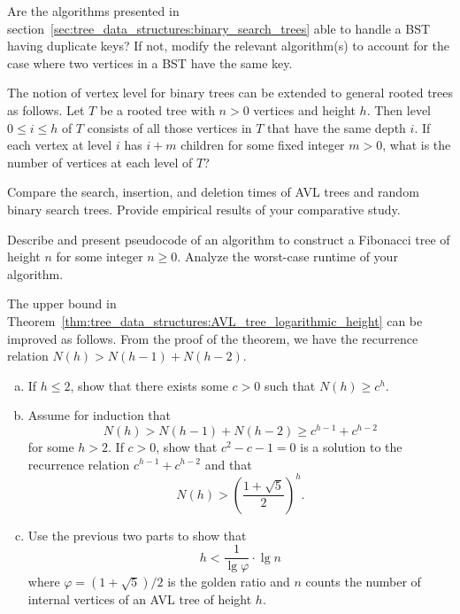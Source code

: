 \begin{problem}
\item Are the algorithms presented in
  section~\ref{sec:tree_data_structures:binary_search_trees} able to
  handle a BST having duplicate keys? If not, modify the relevant
  algorithm(s) to account for the case where two vertices in a BST
  have the same key.

\item The notion of vertex level for binary trees can be extended to
  general rooted trees as follows. Let $T$ be a rooted tree with
  $n > 0$ vertices and height $h$. Then level
  $0 \leq i \leq h$ of $T$ consists of all those vertices in $T$ that
  have the same depth $i$. If each vertex at level $i$ has $i + m$
  children for some fixed integer $m > 0$, what is the number of
  vertices at each level of $T$?

\item Compare the search, insertion, and deletion times of AVL trees
  and random binary search trees. Provide empirical results of your
  comparative study.

\item Describe and present pseudocode of an algorithm to construct a
  Fibonacci tree of height $n$ for some integer
  $n \geq 0$. Analyze the worst-case runtime of your algorithm.

\item The upper bound in
  Theorem~\ref{thm:tree_data_structures:AVL_tree_logarithmic_height}
  can be improved as follows. From the proof of the theorem, we have
  the recurrence relation
  $N(h) > N(h - 1) + N(h - 2)$.
  \begin{enumerate}[(a)]
  \item If $h \leq 2$, show that there exists some $c > 0$ such that
    $N(h) \geq c^h$.

  \item Assume for induction that
    \[
    N(h)
    >
    N(h - 1) + N(h - 2)
    \geq
    c^{h-1} + c^{h-2}
    \]
    for some $h > 2$. If $c > 0$, show that $c^2 - c - 1 = 0$ is a
    solution to the recurrence relation
    $c^{h-1} + c^{h-2}$ and that
    \[
    N(h)
    >
    \left( \frac{1 + \sqrt{5}} {2} \right)^h.
    \]

  \item Use the previous two parts to show that
    \[
    h
    <
    \frac{1}{\lg \varphi} \cdot \lg n
    \]
    where $\varphi = (1 + \sqrt{5}) / 2$ is the
    golden ratio and $n$ counts the number of
    internal vertices of an AVL tree of height
    $h$.
  \end{enumerate}


\end{problem}
